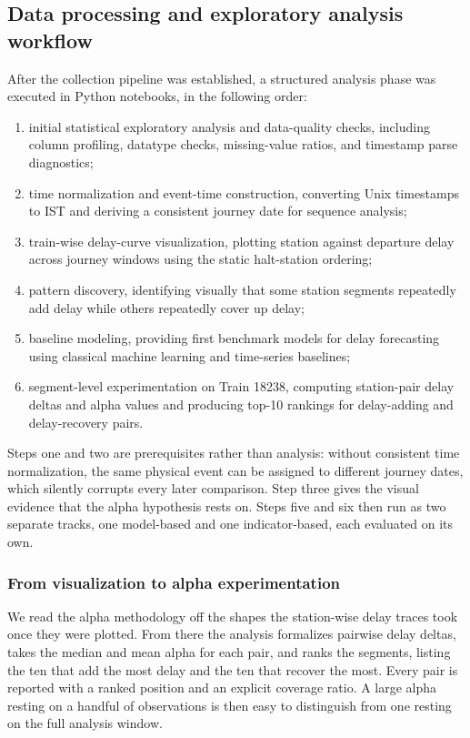 \documentclass[a4paper,fleqn]{cas-dc}
\begin{document}
\subsection{Data processing and exploratory analysis workflow}
After the collection pipeline was established, a structured analysis phase was
executed in Python notebooks, in the following order:
\begin{enumerate}
    \item initial statistical exploratory analysis and data-quality checks,
          including column profiling, datatype checks, missing-value ratios,
          and timestamp parse diagnostics;
    \item time normalization and event-time construction, converting Unix
          timestamps to IST and deriving a consistent journey date for
          sequence analysis;
    \item train-wise delay-curve visualization, plotting station against
          departure delay across journey windows using the static
          halt-station ordering;
    \item pattern discovery, identifying visually that some station segments
          repeatedly add delay while others repeatedly cover up delay;
    \item baseline modeling, providing first benchmark models for delay
          forecasting using classical machine learning and time-series
          baselines;
    \item segment-level experimentation on Train 18238, computing
          station-pair delay deltas and alpha values and producing top-10
          rankings for delay-adding and delay-recovery pairs.
\end{enumerate}
Steps one and two are prerequisites rather than analysis: without consistent
time normalization, the same physical event can be assigned to different
journey dates, which silently corrupts every later comparison. Step three
gives the visual evidence that the alpha hypothesis rests on. Steps five and
six then run as two separate tracks, one model-based and one indicator-based,
each evaluated on its own.

\subsubsection{From visualization to alpha experimentation}
We read the alpha methodology off the shapes the station-wise delay traces
took once they were plotted. From there the analysis formalizes pairwise delay
deltas, takes the median and mean alpha for each pair, and ranks the segments,
listing the ten that add the most delay and the ten that recover the most.
Every pair is reported with a ranked position and an explicit coverage ratio.
A large alpha resting on a handful of observations is then easy to distinguish
from one resting on the full analysis window.
\end{document}
